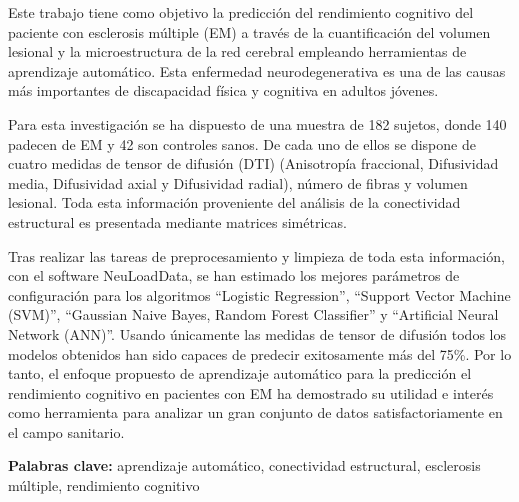 Este trabajo tiene como objetivo la predicción del rendimiento cognitivo del paciente con esclerosis múltiple (EM) a través de la cuantificación del volumen lesional y la microestructura de la red cerebral empleando herramientas de aprendizaje automático. Esta enfermedad neurodegenerativa es una de las causas más importantes de discapacidad física y cognitiva en adultos jóvenes.

Para esta investigación se ha dispuesto de una muestra de 182 sujetos, donde 140 padecen de EM y 42 son controles sanos. De cada uno de ellos se dispone de cuatro medidas de tensor de difusión (DTI) (Anisotropía fraccional, Difusividad media, Difusividad axial y Difusividad radial), número de fibras y volumen lesional. Toda esta información proveniente del análisis de la conectividad estructural  es presentada mediante matrices simétricas.

Tras realizar las tareas de preprocesamiento y limpieza de toda esta información, con el software NeuLoadData, se han estimado los mejores parámetros de configuración para los algoritmos ``Logistic Regression'', ``Support Vector Machine (SVM)'', ``Gaussian Naive Bayes, Random Forest Classifier'' y ``Artificial Neural Network (ANN)''. Usando únicamente las medidas de tensor de difusión todos los modelos obtenidos han sido capaces de predecir exitosamente más del 75\%. Por lo tanto, el enfoque propuesto de aprendizaje automático para la predicción el rendimiento cognitivo en pacientes con EM ha demostrado su utilidad e interés como herramienta para analizar un gran conjunto de datos satisfactoriamente en el campo sanitario.

\vspace*{1cm}

\textbf{Palabras clave:} aprendizaje automático, conectividad estructural, esclerosis múltiple, rendimiento cognitivo
